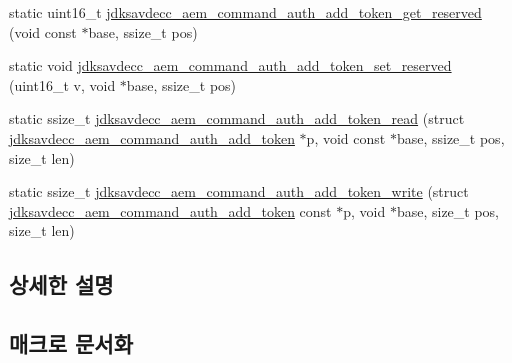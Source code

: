 \begin{DoxyCompactItemize}
\item 
static uint16\+\_\+t \hyperlink{group__command__auth__add__token_gabe74700fee16d590ad3273e5f566c1ee}{jdksavdecc\+\_\+aem\+\_\+command\+\_\+auth\+\_\+add\+\_\+token\+\_\+get\+\_\+reserved} (void const $\ast$base, ssize\+\_\+t pos)
\item 
static void \hyperlink{group__command__auth__add__token_ga6a132981be80b52da7586e6607427985}{jdksavdecc\+\_\+aem\+\_\+command\+\_\+auth\+\_\+add\+\_\+token\+\_\+set\+\_\+reserved} (uint16\+\_\+t v, void $\ast$base, ssize\+\_\+t pos)
\item 
static ssize\+\_\+t \hyperlink{group__command__auth__add__token_gaa1db6b8fca96031bb6fb3db33fb2f066}{jdksavdecc\+\_\+aem\+\_\+command\+\_\+auth\+\_\+add\+\_\+token\+\_\+read} (struct \hyperlink{structjdksavdecc__aem__command__auth__add__token}{jdksavdecc\+\_\+aem\+\_\+command\+\_\+auth\+\_\+add\+\_\+token} $\ast$p, void const $\ast$base, ssize\+\_\+t pos, size\+\_\+t len)
\item 
static ssize\+\_\+t \hyperlink{group__command__auth__add__token_ga446d2a38a15595f3801a8b3a82d34be6}{jdksavdecc\+\_\+aem\+\_\+command\+\_\+auth\+\_\+add\+\_\+token\+\_\+write} (struct \hyperlink{structjdksavdecc__aem__command__auth__add__token}{jdksavdecc\+\_\+aem\+\_\+command\+\_\+auth\+\_\+add\+\_\+token} const $\ast$p, void $\ast$base, size\+\_\+t pos, size\+\_\+t len)
\end{DoxyCompactItemize}


\subsection{상세한 설명}


\subsection{매크로 문서화}

